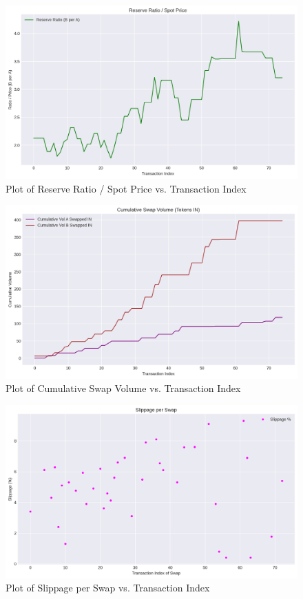 \documentclass[12pt]{article}
\begin{document}
\begin{figure}[H]
    \centering
    \includegraphics[width=\textwidth]{../task2_plots/reserve_ratio_spot_price.png}
    \caption{Plot of Reserve Ratio / Spot Price vs. Transaction Index}
    \label{fig:ratio}
\end{figure}

\begin{figure}[H]
    \centering
    \includegraphics[width=\textwidth]{../task2_plots/swap_volume.png}
    \caption{Plot of Cumulative Swap Volume vs. Transaction Index}
    \label{fig:volume}
\end{figure}

\begin{figure}[H]
    \centering
    \includegraphics[width=\textwidth]{../task2_plots/slippage.png}
    \caption{Plot of Slippage per Swap vs. Transaction Index}
    \label{fig:slippage}
\end{figure}
\end{document}
